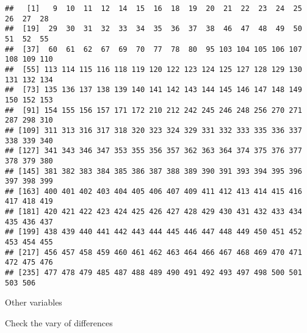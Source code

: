 \documentclass[
]{article}
\newenvironment{Shaded}{\begin{snugshade}}{\end{snugshade}}
\newcommand{\AttributeTok}[1]{\textcolor[rgb]{0.77,0.63,0.00}{#1}}
\newcommand{\FunctionTok}[1]{\textcolor[rgb]{0.00,0.00,0.00}{#1}}
\newcommand{\NormalTok}[1]{#1}
\newcommand{\OtherTok}[1]{\textcolor[rgb]{0.56,0.35,0.01}{#1}}
\newcommand{\SpecialCharTok}[1]{\textcolor[rgb]{0.00,0.00,0.00}{#1}}
\newcommand{\StringTok}[1]{\textcolor[rgb]{0.31,0.60,0.02}{#1}}
\begin{document}
\begin{verbatim}
##   [1]   9  10  11  12  14  15  16  18  19  20  21  22  23  24  25  26  27  28
##  [19]  29  30  31  32  33  34  35  36  37  38  46  47  48  49  50  51  52  55
##  [37]  60  61  62  67  69  70  77  78  80  95 103 104 105 106 107 108 109 110
##  [55] 113 114 115 116 118 119 120 122 123 124 125 127 128 129 130 131 132 134
##  [73] 135 136 137 138 139 140 141 142 143 144 145 146 147 148 149 150 152 153
##  [91] 154 155 156 157 171 172 210 212 242 245 246 248 256 270 271 287 298 310
## [109] 311 313 316 317 318 320 323 324 329 331 332 333 335 336 337 338 339 340
## [127] 341 343 346 347 353 355 356 357 362 363 364 374 375 376 377 378 379 380
## [145] 381 382 383 384 385 386 387 388 389 390 391 393 394 395 396 397 398 399
## [163] 400 401 402 403 404 405 406 407 409 411 412 413 414 415 416 417 418 419
## [181] 420 421 422 423 424 425 426 427 428 429 430 431 432 433 434 435 436 437
## [199] 438 439 440 441 442 443 444 445 446 447 448 449 450 451 452 453 454 455
## [217] 456 457 458 459 460 461 462 463 464 466 467 468 469 470 471 472 475 476
## [235] 477 478 479 485 487 488 489 490 491 492 493 497 498 500 501 503 506
\end{verbatim}

Other variables

\begin{Shaded}
\end{Shaded}

Check the vary of differences

\begin{Shaded}
\end{Shaded}
\end{document}
